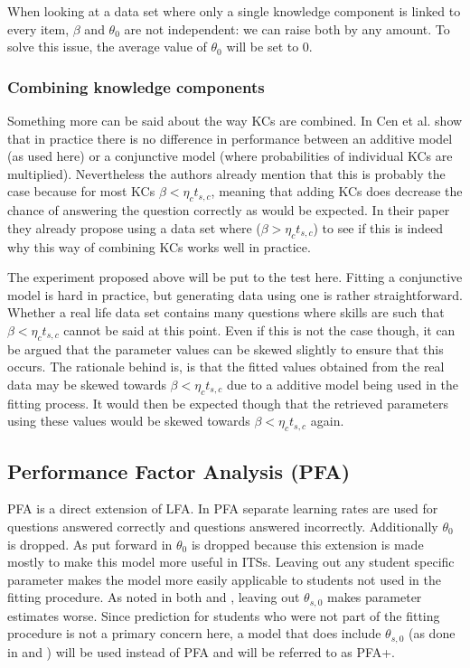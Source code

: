 \documentclass{scrartcl}
\begin{document}
When looking at a data set where only a single knowledge component is linked to every item, $\beta$ and $\theta_{0}$ are not independent: we can raise both by any amount. To solve this issue, the average value of $\theta_{0}$ will be set to 0.
\subsubsection{Combining knowledge components}
\label{sec:comb}
Something more can be said about the way KCs are combined. In \cite{skillcombi} Cen et al. show that in practice there is no difference in performance between an additive model (as used here) or a conjunctive model (where probabilities of individual KCs are multiplied). Nevertheless the authors already mention that this is probably the case because for most KCs $\beta < \eta_{c} t_{s,c}$, meaning that adding KCs does decrease the chance of answering the question correctly as would be expected. In their paper they already propose using a data set where ($\beta > \eta_{c} t_{s,c}$) to see if this is indeed why this way of combining KCs works well in practice.

The experiment proposed above will be put to the test here. Fitting a conjunctive model is hard in practice, but generating data using one is rather straightforward. Whether a real life data set contains many questions where skills are such that $\beta < \eta_{c} t_{s,c}$ cannot be said at this point. Even if this is not the case though, it can be argued that the parameter values can be skewed slightly to ensure that this occurs. The rationale behind is, is that the fitted values obtained from the real data may be skewed towards $\beta < \eta_{c} t_{s,c}$ due to a additive model being used in the fitting process. It would then be expected though that the retrieved parameters using these values would be skewed towards $\beta < \eta_{c} t_{s,c}$ again.

\subsection{Performance Factor Analysis (PFA)}
PFA is a direct extension of LFA. In PFA separate learning rates are used for questions answered correctly and questions answered incorrectly. Additionally $\theta_{0}$ is dropped. As put forward in \cite{pfa} $\theta_{0}$ is dropped because this extension is made mostly to make this model more useful in ITSs. Leaving out any student specific parameter makes the model more easily applicable to students not used in the fitting procedure. As noted in both \cite{ktpfa} and \cite{blackart}, leaving out $\theta_{s,0}$ makes parameter estimates worse. Since prediction for students who were not part of the fitting procedure is not a primary concern here, a model that does include $\theta_{s,0}$ (as done in \cite{ktpfa} and \cite{blackart}) will be used instead of PFA and will be referred to as PFA+.
\end{document}
